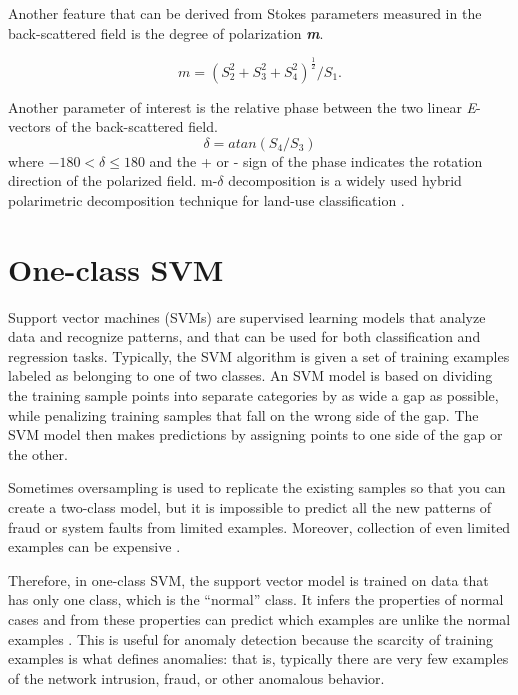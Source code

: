 Another feature that can be derived from Stokes parameters measured in the back-scattered field is the degree of polarization \textit{\textbf{m}}.

\begin{equation}
\label{eq1}
  m = ( S_2^2 + S_3^2 + S_4^2 )^\frac{1}{2}/S_1.
\end{equation}

Another parameter of interest is the relative phase between the two linear \textit{E}-vectors of the back-scattered field.
\begin{equation}
\label{eq2}
  \delta = atan( S_4 / S_3 ) 
\end{equation}
where $-180 < \delta \leq 180$ and the + or - sign of the phase indicates the rotation direction of the polarized field\cite{raney2007hybrid}. m-$\delta$ decomposition is a widely used hybrid polarimetric decomposition technique for land-use classification \cite{chirakkal2017evaluation}.

\section{One-class SVM}
Support vector machines (SVMs) are supervised learning models that analyze data and recognize patterns, and that can be used for both classification and regression tasks. Typically, the SVM algorithm is given a set of training examples labeled as belonging to one of two classes. An SVM model is based on dividing the training sample points into separate categories by as wide a gap as possible, while penalizing training samples that fall on the wrong side of the gap. The SVM model then makes predictions by assigning points to one side of the gap or the other.

Sometimes oversampling is used to replicate the existing samples so that you can create a two-class model, but it is impossible to predict all the new patterns of fraud or system faults from limited examples. Moreover, collection of even limited examples can be expensive \cite{tax2004support}.

Therefore, in one-class SVM, the support vector model is trained on data that has only one class, which is the “normal” class. It infers the properties of normal cases and from these properties can predict which examples are unlike the normal examples \cite{scholkopf2000support}. This is useful for anomaly detection because the scarcity of training examples is what defines anomalies: that is, typically there are very few examples of the network intrusion, fraud, or other anomalous behavior.

